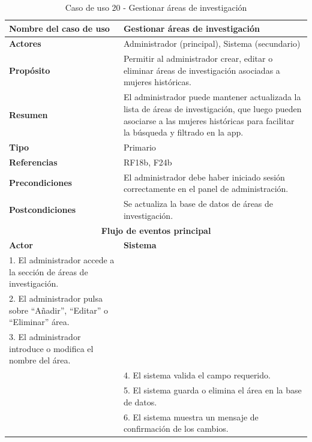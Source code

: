 \begin{table}[H]
\centering
\caption{Caso de uso 20 - Gestionar áreas de investigación}
\begin{tabular}{|p{4.5cm}|p{10.5cm}|}
\hline
\textbf{Nombre del caso de uso} & Gestionar áreas de investigación \\
\hline
\textbf{Actores} & Administrador (principal), Sistema (secundario) \\
\hline
\textbf{Propósito} & Permitir al administrador crear, editar o eliminar áreas de investigación asociadas a mujeres históricas. \\
\hline
\textbf{Resumen} & El administrador puede mantener actualizada la lista de áreas de investigación, que luego pueden asociarse a las mujeres históricas para facilitar la búsqueda y filtrado en la app. \\
\hline
\textbf{Tipo} & Primario \\
\hline
\textbf{Referencias} & RF18b, F24b \\
\hline
\textbf{Precondiciones} & El administrador debe haber iniciado sesión correctamente en el panel de administración. \\
\hline
\textbf{Postcondiciones} & Se actualiza la base de datos de áreas de investigación. \\
\hline
\multicolumn{2}{|c|}{\textbf{Flujo de eventos principal}} \\
\hline
\textbf{Actor} & \textbf{Sistema} \\
\hline
1. El administrador accede a la sección de áreas de investigación. & \\
\hline
2. El administrador pulsa sobre “Añadir”, “Editar” o “Eliminar” área. & \\
\hline
3. El administrador introduce o modifica el nombre del área. & \\
\hline
& 4. El sistema valida el campo requerido. \\
\hline
& 5. El sistema guarda o elimina el área en la base de datos. \\
\hline
& 6. El sistema muestra un mensaje de confirmación de los cambios. \\
\hline
\end{tabular}
\end{table}